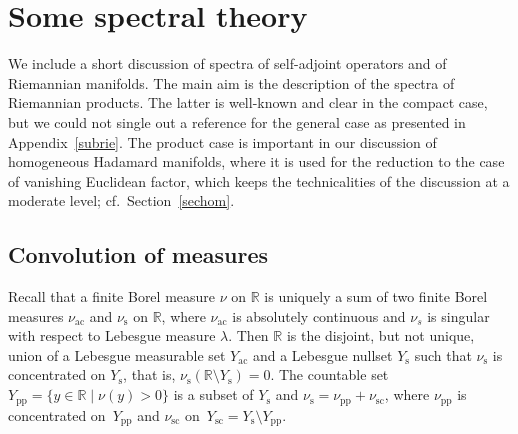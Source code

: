 \documentclass[10pt,a4paper]{amsart}
\numberwithin{equation}{section}
\def\p{\mathrm{pp}}
\def\ac{\mathrm{ac}}
\def\sc{\mathrm{sc}}
\def\s{\mathrm s}
\def\R{\mathbb R}
\begin{document}
\appendix

\section{Some spectral theory}\label{secspec}

We include a short discussion of spectra of self-adjoint operators and of Riemannian manifolds.
The main aim is the description of the spectra of Riemannian products.
The latter is well-known and clear in the compact case,
but we could not single out a reference for the general case as presented in Appendix~\ref{subrie}.
The product case is important in our discussion of homogeneous Hadamard manifolds,
where it is used for the reduction to the case of vanishing Euclidean factor,
which keeps the technicalities of the discussion at a moderate level; cf.\ Section~\ref{sechom}.

\subsection{Convolution of measures}%
Recall that a finite Borel measure $\nu$ on $\R$ is uniquely a sum of two finite Borel measures $\nu_{\ac}$ and $\nu_{\s}$ on $\R$,
where $\nu_{\ac}$ is absolutely continuous and $\nu_{s}$ is singular with respect to Lebesgue measure $\lambda$.
Then $\R$ is the disjoint, but not unique, union of a Lebesgue measurable set $Y_{\ac}$ and a Lebesgue nullset $Y_{\s}$ such that $\nu_{\s}$ is concentrated on $Y_{\s}$,
that is, $\nu_{\s}(\R\setminus Y_{\s})=0$.
The countable set $Y_{\p}=\{y\in\R\mid\nu(y)>0\}$ is a subset of $Y_{\s}$
and $\nu_{\s}=\nu_{\p}+\nu_{\sc}$,
where $\nu_{\p}$ is concentrated on~$Y_{\p}$ and $\nu_{\sc}$ on~$Y_{\sc}=Y_{\s}\setminus Y_{\p}$.
\end{document}
